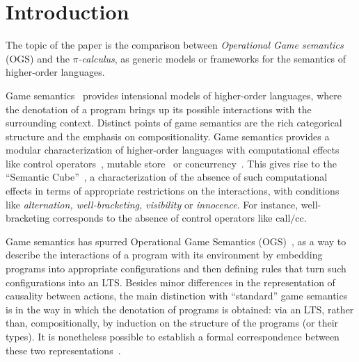 \documentclass[11pt,a4paper]{amsart}
\theoremstyle{plain}
\theoremstyle{definition}
\theoremstyle{defC}
\theoremstyle{thmC}
\theoremstyle{plain}
\numberwithin{equation}{section}
\newcommand{\callcc}{\mathrm{call/cc}}
\theoremstyle{plain}
\theoremstyle{definition}
\begin{document}
\section{Introduction}
\label{s:intro}
             

The topic of the paper is the comparison between 
\emph{Operational Game semantics} (OGS) and the \emph{$\pi$-calculus}, as generic
models or frameworks for the semantics of higher-order languages.  

Game semantics~\cite{10.1006/inco.2000.2917,10.1006/inco.2000.2930} provides
intensional models of higher-order languages,
where the denotation of a program brings up its possible  interactions with the
surrounding context.
Distinct points of game semantics are the 
rich categorical structure and the emphasis on compositionality.
Game semantics provides a modular characterization of higher-order languages with
 computational effects like control operators~\cite{10.5555/788019.788859}, 
 mutable store~\cite{abramsky1997linearity,10.5555/788020.788891} 
 or concurrency~\cite{ghica2004angelic,10.1007/11944836_38}.
 This gives rise to the ``Semantic Cube''~\cite{10.5555/645726.667210},
 a characterization of the absence of such computational effects
 in terms of appropriate restrictions on the interactions, with conditions
 like \emph{alternation, well-bracketing, visibility} or \emph{innocence}.
For instance, well-bracketing corresponds to the absence of control operators
like $\callcc$.

Game semantics has spurred Operational Game Semantics
(OGS)~\cite{jagadeesan2009open,jeffrey2005java,laird2007,10.1016/j.entcs.2012.08.013,10.1145/2603088.2603150},
as a way to describe the interactions of a program with its 
environment by embedding  programs into appropriate configurations and then defining rules
that turn such configurations into an LTS.
Besides minor differences in the representation of causality between actions,
the main distinction with ``standard'' game semantics
is in the way in which the denotation of programs is obtained:
via an LTS, rather than, 
compositionally, by induction on the structure of the programs (or their types).
It is nonetheless possible to establish a formal correspondence between these two 
representations~\cite{10.1145/2603088.2603150}.
\end{document}
